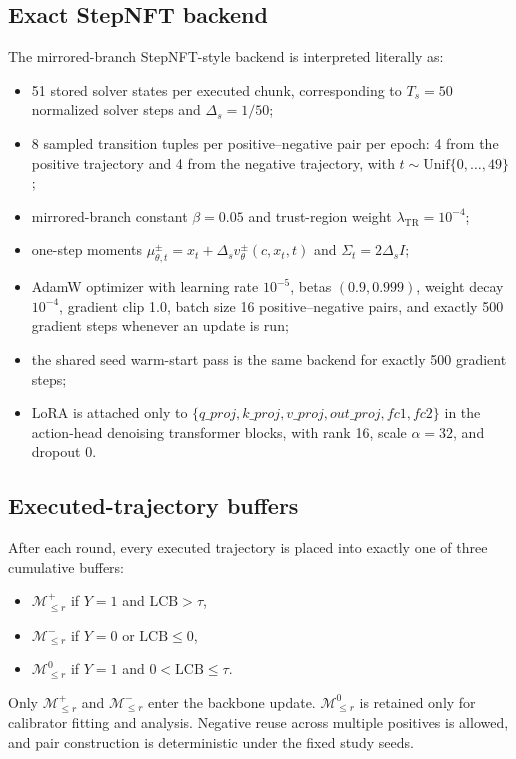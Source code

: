 \documentclass[10pt]{article}
\theoremstyle{plain}
\theoremstyle{definition}
\theoremstyle{remark}
\newcommand{\LCB}{\mathrm{LCB}}
\begin{document}
\subsection{Exact StepNFT backend}
The mirrored-branch StepNFT-style backend is interpreted literally as:
\begin{itemize}
    \item 51 stored solver states per executed chunk, corresponding to $T_s=50$ normalized solver steps and $\Delta_s=1/50$;
    \item 8 sampled transition tuples per positive--negative pair per epoch: 4 from the positive trajectory and 4 from the negative trajectory, with $t\sim\mathrm{Unif}\{0,\dots,49\}$;
    \item mirrored-branch constant $\beta=0.05$ and trust-region weight $\lambda_{\mathrm{TR}}=10^{-4}$;
    \item one-step moments $\mu^{\pm}_{\theta,t}=x_t+\Delta_s v^\pm_{\theta}(c,x_t,t)$ and $\Sigma_t=2\Delta_s I$;
    \item AdamW optimizer with learning rate $10^{-5}$, betas $(0.9,0.999)$, weight decay $10^{-4}$, gradient clip 1.0, batch size 16 positive--negative pairs, and exactly 500 gradient steps whenever an update is run;
    \item the shared seed warm-start pass is the same backend for exactly 500 gradient steps;
    \item LoRA is attached only to $\{q\_proj,k\_proj,v\_proj,out\_proj,fc1,fc2\}$ in the action-head denoising transformer blocks, with rank 16, scale $\alpha=32$, and dropout 0.
\end{itemize}

\subsection{Executed-trajectory buffers}
After each round, every executed trajectory is placed into exactly one of three cumulative buffers:
\begin{itemize}
    \item $\mathcal M_{\le r}^{+}$ if $Y=1$ and $\LCB>\tau$,
    \item $\mathcal M_{\le r}^{-}$ if $Y=0$ or $\LCB\le 0$,
    \item $\mathcal M_{\le r}^{0}$ if $Y=1$ and $0<\LCB\le\tau$.
\end{itemize}
Only $\mathcal M_{\le r}^{+}$ and $\mathcal M_{\le r}^{-}$ enter the backbone update. $\mathcal M_{\le r}^{0}$ is retained only for calibrator fitting and analysis. Negative reuse across multiple positives is allowed, and pair construction is deterministic under the fixed study seeds.
\end{document}
